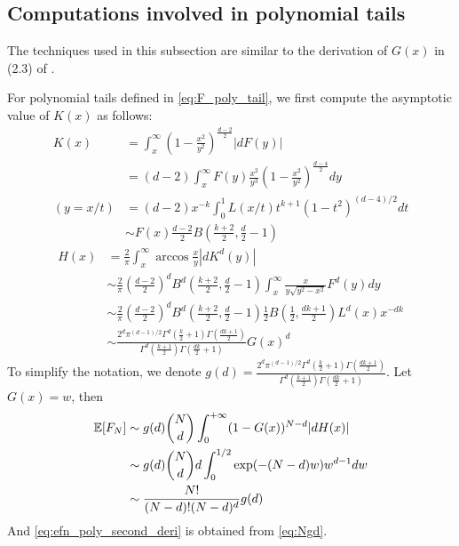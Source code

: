 \documentclass{aptpub}
\def\E{\mathbb{E}}
\begin{document}
\subsection{Computations involved in polynomial tails}
The techniques used in this subsection are similar to the derivation of $G(x)$
in (2.3) of \cite{carnal1970konvexe}.

For polynomial tails defined in \eqref{eq:F_poly_tail},
we first compute the asymptotic value of $K(x)$
as follows:
\begin{align*}
     K(x) & = \int_x^{\infty} (1-\frac{x^2}{y^2})^{\frac{d-2}{2}} |dF(y)| \\
     &= (d-2)\int_x^{\infty} F(y)\frac{x^2}{y^3} (1-\frac{x^2}{y^2})^{\frac{d-4}{2}} dy\\
     (y=x/t) &= (d-2)x^{-k} \int_0^{1} L(x/t) t^{k+1} (1-t^2)^{(d-4)/2}dt \\
     & \sim F(x) \frac{d-2}{2} B\left(\frac{k+2}{2}, \frac{d}{2}-1\right) 
\end{align*}
\begin{align*}
     H(x) &= \frac{2}{\pi}
     \int_x^{\infty} \arccos\frac{x}{y}
     |d K^d(y)| \\
     &\sim \frac{2}{\pi}\left(\frac{d-2}{2}\right)^d
     B^d\left(\frac{k+2}{2}, \frac{d}{2}-1\right)
     \int_x^{\infty} \frac{x}{y \sqrt{y^2-x^2}} F^d(y) dy \\
     &\sim \frac{2}{\pi}\left(\frac{d-2}{2}\right)^d
     B^d\left(\frac{k+2}{2}, \frac{d}{2}-1\right) \frac{1}{2}
     B\left(\frac{1}{2}, \frac{dk+1}{2}\right)L^d(x) x^{-dk} \\
     &\sim \frac{2^d \pi^{(d-1)/2}\Gamma^d(\frac{k}{2}+1)
     \Gamma(\frac{dk+1}{2})}{
         \Gamma^d(\frac{k+1}{2}) \Gamma(\frac{dk}{2}+1)} G(x)^d 
\end{align*}
To simplify the notation, we denote $g(d)=\frac{2^d \pi^{(d-1)/2}\Gamma^d(\frac{k}{2}+1)
\Gamma(\frac{dk+1}{2})}{
    \Gamma^d(\frac{k+1}{2}) \Gamma(\frac{dk}{2}+1)}$.
Let $G(x)=w$, then
\begin{align}
     \E[F_N] &\sim g(d)\binom{N}{d} \int_0^{+\infty} 
      (1-G(x))^{N-d} |dH(x)| \notag \\
      &\sim g(d)\binom{N}{d}d\int_0^{1/2} \exp(-(N-d)w)w^{d-1}dw
      \notag \\
      &\sim \frac{N!}{(N-d)! (N-d)^d}g(d) \label{eq:Ngd}
\end{align}
And \eqref{eq:efn_poly_second_deri} is obtained from \eqref{eq:Ngd}.
\end{document}
